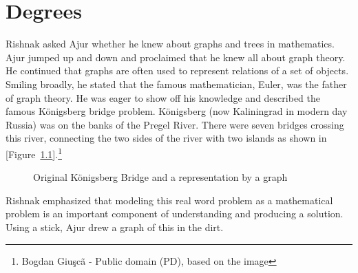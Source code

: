 \chapter{Degrees}
Rishnak asked Ajur whether he knew about graphs and trees in mathematics. Ajur jumped up and down and proclaimed that he knew all about graph theory. He continued that graphs are often used to represent relations of a set of objects. Smiling broadly, he stated that the famous mathematician, Euler, was the father of graph theory. He was eager to show off his knowledge and described the famous  K\"{o}nigsberg bridge problem. K\"{o}nigsberg (now Kaliningrad in modern day Russia) was on the banks of the Pregel River.
There were  seven bridges crossing this river, connecting the two sides of the river with two islands as shown in  [Figure~\ref{kon0}].\footnote{Bogdan Giu\c{s}c\~{a} - Public domain (PD), based on the image}
\begin{figure}%
    \centering
    \qquad
    \caption{Original K\"{o}nigsberg Bridge and a representation by a graph}%
    \label{kon0}%
\end{figure}
%
Rishnak emphasized that modeling this real word problem as a mathematical problem is an important component of understanding and
producing a solution.
Using a stick, Ajur drew a graph of this in the dirt.

